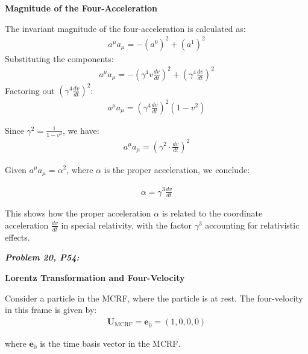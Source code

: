 \documentclass[12pt]{book}
\begin{document}
            \textbf{Magnitude of the Four-Acceleration}
            
            The invariant magnitude of the four-acceleration is calculated as:
            \begin{align}
            a^\mu a_\mu = -(a^0)^2 + (a^1)^2
            \end{align}
            Substituting the components:
            \begin{align}
            a^\mu a_\mu = -\left(\gamma^4 v \frac{dv}{dt}\right)^2 + \left(\gamma^4 \frac{dv}{dt}\right)^2
            \end{align}
            Factoring out \( \left(\gamma^4 \frac{dv}{dt}\right)^2 \):
            \begin{align}
            a^\mu a_\mu = \left(\gamma^4 \frac{dv}{dt}\right)^2 \left(1 - v^2\right)
            \end{align}
            
            Since \( \gamma^2 = \frac{1}{1 - v^2} \), we have:
            \begin{align}
            a^\mu a_\mu = \left(\gamma^2 \cdot \frac{dv}{dt}\right)^2
            \end{align}
            
            Given \( a^\mu a_\mu = \alpha^2 \), where \( \alpha \) is the proper acceleration, we conclude:
            
            \begin{align}
            \alpha = \gamma^3 \frac{dv}{dt}
            \end{align}
            
            This shows how the proper acceleration \( \alpha \) is related to the coordinate acceleration \( \frac{dv}{dt} \) in special relativity, with the factor \( \gamma^3 \) accounting for relativistic effects.

        \textbf{\textit{Problem 20, P54:}}
        
            \textbf{Lorentz Transformation and Four-Velocity}

            Consider a particle in the MCRF, where the particle is at rest. The four-velocity in this frame is given by:
            \begin{align}
            \mathbf{U}_{\text{MCRF}} = \mathbf{e}_{\bar{0}} = (1, 0, 0, 0)
            \end{align}
            
            where \( \mathbf{e}_{\bar{0}} \) is the time basis vector in the MCRF.
            
\end{document}
